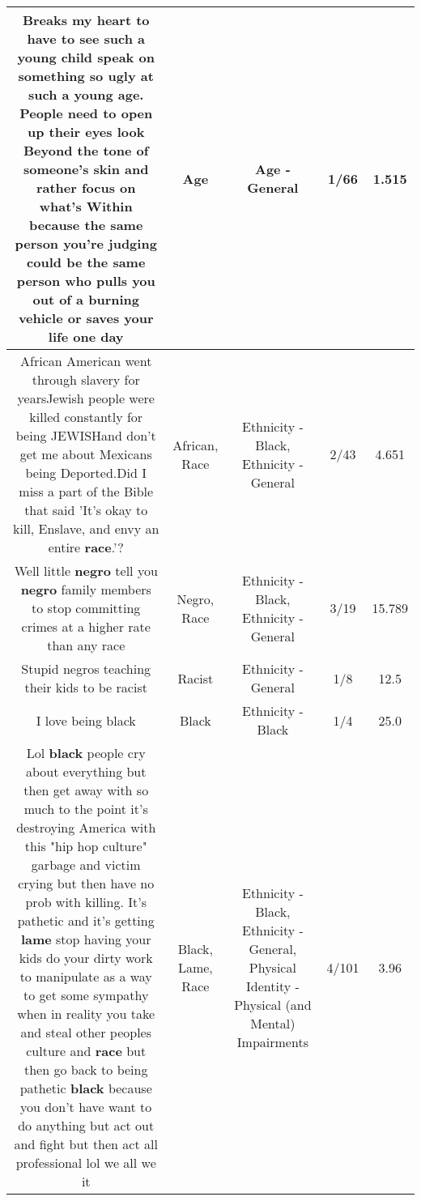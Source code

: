 \documentclass[11pt]{article}
\newlength\mylength
\begin{document}
\begin{center}
\begin{longtable}{|C{.65\mylength}|C{.30\mylength}|C{.12\mylength}|C{.12\mylength}|C{.12\mylength}|}
  \small Breaks my heart to have to see such a young child speak on something so ugly at such a young \textbf{age}. People need to open up their eyes look Beyond the tone of someone's skin and rather focus on what's Within because the same person you're judging could be the same person who pulls you out of a burning vehicle or saves your life one day\normalsize   & Age & Age - General & 1/66 & 1.515 \\  \hline
  \small African American went through slavery for yearsJewish people were killed constantly for being JEWISHand don't get me about Mexicans being Deported.Did I miss a part of the Bible that said 'It's okay to kill, Enslave, and envy an entire \textbf{race}.'?\normalsize   & African, Race & Ethnicity - Black, Ethnicity - General & 2/43 & 4.651 \\  \hline
  \small Well little \textbf{negro} tell you \textbf{negro} family members to stop committing crimes at a higher rate than any race\normalsize   & Negro, Race & Ethnicity - Black, Ethnicity - General & 3/19 & 15.789 \\  \hline
  \small Stupid negros teaching their kids to be racist\normalsize   & Racist & Ethnicity - General & 1/8 & 12.5 \\  \hline
  \small I love being black\normalsize   & Black & Ethnicity - Black & 1/4 & 25.0 \\  \hline
  \small Lol \textbf{black} people cry about everything but then get away with so much to the point it's destroying America with this "hip hop culture" garbage and victim crying but then have no prob with killing. It's pathetic and it's getting \textbf{lame} stop having your kids do your dirty work to manipulate as a way to get some sympathy when in reality you take and steal other peoples culture and \textbf{race} but then go back to being pathetic \textbf{black} because you don't have want to do anything but act out and fight but then act all professional lol we all we it\normalsize   & Black, Lame, Race & Ethnicity - Black, Ethnicity - General, Physical Identity - Physical (and Mental) Impairments & 4/101 & 3.96 \\  \hline

\end{longtable}
\end{center}
\end{document}
